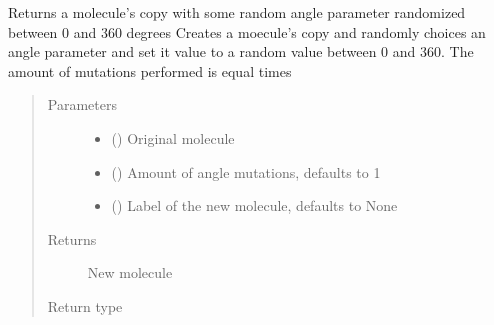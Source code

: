 \documentclass[letterpaper,10pt,english]{sphinxmanual}
\begin{document}

\begin{fulllineitems}
\label{\detokenize{molecular:molecular.mutate_angles}}
\sphinxAtStartPar
Returns a molecule’s copy with some random angle parameter randomized between 0 and 360 degrees
Creates a moecule’s copy and randomly choices an angle parameter and set it value to a random value between 0 and
360. The amount of mutations performed is equal times
\begin{quote}\begin{description}
\item[{Parameters}] \leavevmode\begin{itemize}
\item {} 
\sphinxAtStartPar
{} ({\hyperref[\detokenize{molecular:molecular.Molecule}]{}}) \textendash{} Original molecule

\item {} 
\sphinxAtStartPar
{} (\sphinxstyleliteralemphasis{\sphinxupquote{, }}) \textendash{} Amount of angle mutations, defaults to 1

\item {} 
\sphinxAtStartPar
{} (\sphinxstyleliteralemphasis{\sphinxupquote{, }}) \textendash{} Label of the new molecule, defaults to None

\end{itemize}

\item[{Returns}] \leavevmode
\sphinxAtStartPar
New molecule

\item[{Return type}] \leavevmode
\sphinxAtStartPar
{\hyperref[\detokenize{molecular:molecular.Molecule}]{}}

\end{description}\end{quote}

\end{fulllineitems}
\end{document}
